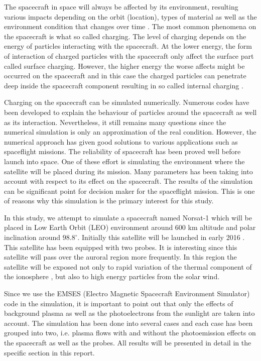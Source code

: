 

The spacecraft in space will always be affected by its environment, resulting various
impacts depending on the orbit (location), types of material as well as the environment
condition that changes over time \citep{trove.nla.gov.au/work/21680840}. The  most common phenomena on the spacecraft is what so
called charging. The level of charging depends on the energy of particles interacting with
the spacecraft. At the lower energy, the form of interaction of charged particles with the
spacecraft only affect the surface part called surface charging. However, the higher energy
the worse affects might be occurred on the spacecraft and in this case the charged particles
can penetrate deep inside the spacecraft component resulting in so called internal charging \citep{fennell2001spacecraft}.

Charging on the spacecraft can be simulated numerically. Numerous codes have been developed
to explain the behaviour of particles around the spacecraft as well as its interaction.
Nevertheless, it still remains many questions since the numerical simulation is only an approximation
of the real condition. However, the numerical approach has given good solutions to various applications
such as spaceflight missions. The reliability of spacecraft has been proved well before launch into space.
One of these effort is simulating the environment where the satellite will be placed during its mission.
Many parameters has been taking into account with respect to its effect on the spacecraft.
The results of the simulation can be significant point for decision maker for the spaceflight
mission. This is one of reasons why this simulation is the primary interest for this study.

In this study, we attempt to simulate a spacecraft named Norsat-1 which will be placed in
Low Earth Orbit (LEO) environment around 600 km altitude and polar inclination around \(98.8^\circ\).
Initially this satellite will be launched in early 2016
\citep{norSat}. This satellite
has been equipped with two probes. It is interesting since this satellite will pass over
the auroral region more frequently. In this region  the satellite will be exposed not only to
rapid variation of the thermal component of the ionosphere \citep{hastings1995review}, but also to high
energy particles from the solar wind.

Since we use the EMSES (Electro Magnetic Spacecraft Environment Simulator) code \citep{miyake_plasma_2013} in the
simulation, it is important to point out that only the effects of background plasma as
well as the photoelectrons from the sunlight are taken into account. The simulation
has been done into several cases and each case has been grouped into two, i.e. plasma
flows with and without the photoemission effects on the spacecraft as well as the probes.
All results will be presented in detail in the specific section in this report.
